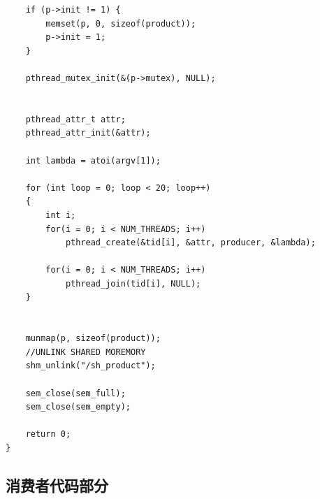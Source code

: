 \documentclass{article}
\begin{document}
\begin{lstlisting}
    if (p->init != 1) {
        memset(p, 0, sizeof(product));
        p->init = 1;
    }

    pthread_mutex_init(&(p->mutex), NULL);


    pthread_attr_t attr;
    pthread_attr_init(&attr);

    int lambda = atoi(argv[1]);

    for (int loop = 0; loop < 20; loop++)
	{
	    int i;
		for(i = 0; i < NUM_THREADS; i++)
	        pthread_create(&tid[i], &attr, producer, &lambda);

	    for(i = 0; i < NUM_THREADS; i++)
	        pthread_join(tid[i], NULL);
	}


    munmap(p, sizeof(product));
    //UNLINK SHARED MOREMORY
    shm_unlink("/sh_product");

    sem_close(sem_full);
    sem_close(sem_empty);

    return 0;
}

\end{lstlisting}

\subsection{消费者代码部分}
\label{subsec:label}
\end{document}
